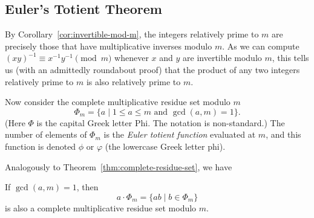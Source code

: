 \subsection{Euler's Totient Theorem}

By Corollary~\ref{cor:invertible-mod-m}, the integers relatively prime to $m$ are precisely those that have multiplicative inverses modulo $m$. As we can compute $(xy)^{-1}\equiv x^{-1}y^{-1}\pmod{m}$ whenever $x$ and $y$ are invertible modulo $m$, this tells us (with an admittedly roundabout proof) that the product of any two integers relatively prime to $m$ is also relatively prime to $m$.

Now consider the complete multiplicative residue set modulo $m$
\begin{equation*}
\Phi_m = \{a\mid 1\leq a\leq m\text{ and }\gcd(a,m) = 1\}.
\end{equation*}
(Here $\Phi$ is the capital Greek letter Phi. The notation is non-standard.) The number of elements of $\Phi_m$ is the \emph{Euler totient function} evaluated at $m$, and this function is denoted $\phi$ or $\varphi$ (the lowercase Greek letter phi).

Analogously to Theorem~\ref{thm:complete-residue-set}, we have 
\begin{theorem}\label{thm:complete-multiplicative-residue-set}
If $\gcd(a,m) = 1$, then
\begin{equation*}
a\cdot\Phi_m = \{ab\mid b\in\Phi_m\}
\end{equation*}
is also a complete multiplicative residue set modulo $m$.
\end{theorem}